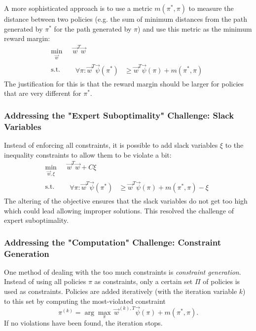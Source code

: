 				A more sophisticated approach is to use a metric \( m(\pi^\ast, \pi) \) to measure the distance between two policies (e.g. the sum of minimum distances from the path generated by \(\pi^\ast\) for the path generated by \(\pi\)) and use this metric as the minimum reward margin:
				\begin{equation*}
					\begin{aligned}
						\min_{\vec{w}} \,& \vec{w}^T \vec{w} \\
						\mathrm{s.t.} \quad&
							\begin{aligned}
								\forall\pi : \vec{w}^T \vec{\psi}(\pi^\ast) &\geq \vec{w}^T \vec{\psi}(\pi) + m(\pi^\ast, \pi)
							\end{aligned}
					\end{aligned}
				\end{equation*}
				The justification for this is that the reward margin should be larger for policies that are very different for \(\pi^\ast\).

			\subsubsection{Addressing the "Expert Suboptimality" Challenge: Slack Variables}
				Instead of enforcing all constraints, it is possible to add slack variables \(\xi\) to the inequality constraints to allow them to be violate a bit:
				\begin{equation*}
					\begin{aligned}
						\min_{\vec{w}, \xi} \,& \vec{w}^T \vec{w} + C \xi \\
						\mathrm{s.t.} \quad&
							\begin{aligned}
								\forall\pi : \vec{w}^T \vec{\psi}(\pi^\ast) &\geq \vec{w}^T \vec{\psi}(\pi) + m(\pi^\ast, \pi) - \xi
							\end{aligned}
					\end{aligned}
				\end{equation*}
				The altering of the objective ensures that the slack variables do not get too high which could lead allowing improper solutions. This resolved the challenge of expert suboptimality.


			\subsubsection{Addressing the "Computation" Challenge: Constraint Generation}
				One method of dealing with the too much constraints is \emph{constraint generation}. Instead of using all policies \(\pi\) as constraints, only a certain set \( \Pi \) of policies is used as constraints. Policies are added iteratively (with the iteration variable \(k\)) to this set by computing the most-violated constraint
				\begin{equation*}
					\pi^{(k)} = \arg\max_\pi\, \vec{w}^{(k), T} \vec{\psi}(\pi) + m(\pi^\ast, \pi).
				\end{equation*}
				If no violations have been found, the iteration stops.

